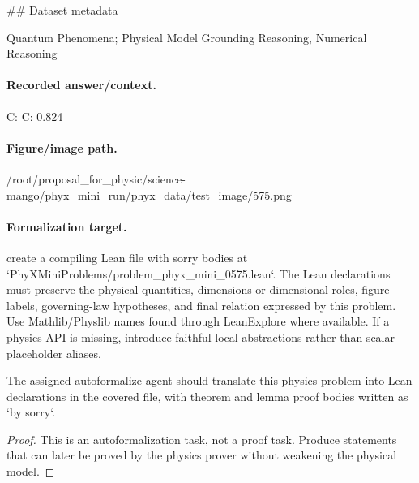 \#\# Dataset metadata

Quantum Phenomena; Physical Model Grounding Reasoning, Numerical Reasoning

\paragraph{Recorded answer/context.}
C: C: 0.824

\paragraph{Figure/image path.}
/root/proposal\_for\_physic/science-mango/phyx\_mini\_run/phyx\_data/test\_image/575.png

\paragraph{Formalization target.}
create a compiling Lean file with sorry bodies at `PhyXMiniProblems/problem\_phyx\_mini\_0575.lean`. The Lean declarations must preserve the physical quantities, dimensions or dimensional roles, figure labels, governing-law hypotheses, and final relation expressed by this problem.
Use Mathlib/Physlib names found through LeanExplore where available. If a physics API is missing, introduce faithful local abstractions rather than scalar placeholder aliases.

\begin{theorem}
\label{thm:physics:phyx_mini_0575:target}
The assigned autoformalize agent should translate this physics problem into Lean declarations in the covered file, with theorem and lemma proof bodies written as `by sorry`.
\end{theorem}
\begin{proof}
This is an autoformalization task, not a proof task. Produce statements that can later be proved by the physics prover without weakening the physical model.
\end{proof}

